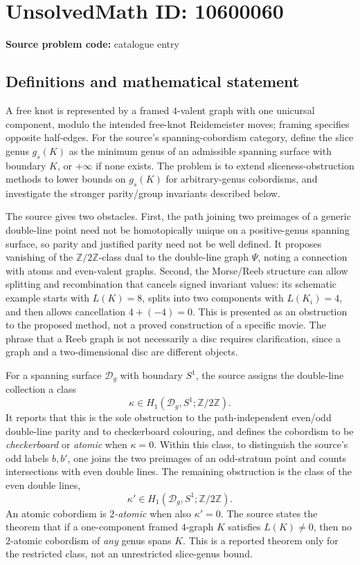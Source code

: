 \documentclass[11pt]{article}
\newcommand{\Z}{\mathbb{Z}}
\begin{document}
\section*{UnsolvedMath ID: 10600060}
\textbf{Source problem code:} catalogue entry
\subsection{Definitions and mathematical statement}
A free knot is represented by a framed \(4\)-valent graph with one unicursal component, modulo the intended free-knot Reidemeister moves; framing specifies opposite half-edges. For the source's spanning-cobordism category, define the slice genus \(g_s(K)\) as the minimum genus of an admissible spanning surface with boundary \(K\), or \(+\infty\) if none exists. The problem is to extend sliceness-obstruction methods to lower bounds on \(g_s(K)\) for arbitrary-genus cobordisms, and investigate the stronger parity/group invariants described below.

The source gives two obstacles. First, the path joining two preimages of a generic double-line point need not be homotopically unique on a positive-genus spanning surface, so parity and justified parity need not be well defined. It proposes vanishing of the \(\Z/2\Z\)-class dual to the double-line graph \(\Psi\), noting a connection with atoms and even-valent graphs. Second, the Morse/Reeb structure can allow splitting and recombination that cancels signed invariant values: its schematic example starts with \(L(K)=8\), splits into two components with \(L(K_i)=4\), and then allows cancellation \(4+(-4)=0\). This is presented as an obstruction to the proposed method, not a proved construction of a specific movie. The phrase that a Reeb graph is not necessarily a disc requires clarification, since a graph and a two-dimensional disc are different objects.

For a spanning surface \(\mathcal D_g\) with boundary \(S^1\), the source assigns the double-line collection a class
\[
 \kappa\in H_1(\mathcal D_g,S^1;\Z/2\Z).
\]
It reports that this is the sole obstruction to the path-independent even/odd double-line parity and to checkerboard colouring, and defines the cobordism to be \emph{checkerboard} or \emph{atomic} when \(\kappa=0\). Within this class, to distinguish the source's odd labels \(b,b'\), one joins the two preimages of an odd-stratum point and counts intersections with even double lines. The remaining obstruction is the class of the even double lines,
\[
 \kappa'\in H_1(\mathcal D_g,S^1;\Z/2\Z).
\]
An atomic cobordism is \emph{\(2\)-atomic} when also \(\kappa'=0\). The source states the theorem that if a one-component framed \(4\)-graph \(K\) satisfies \(L(K)\ne0\), then no \(2\)-atomic cobordism of \emph{any} genus spans \(K\). This is a reported theorem only for the restricted class, not an unrestricted slice-genus bound.
\end{document}
